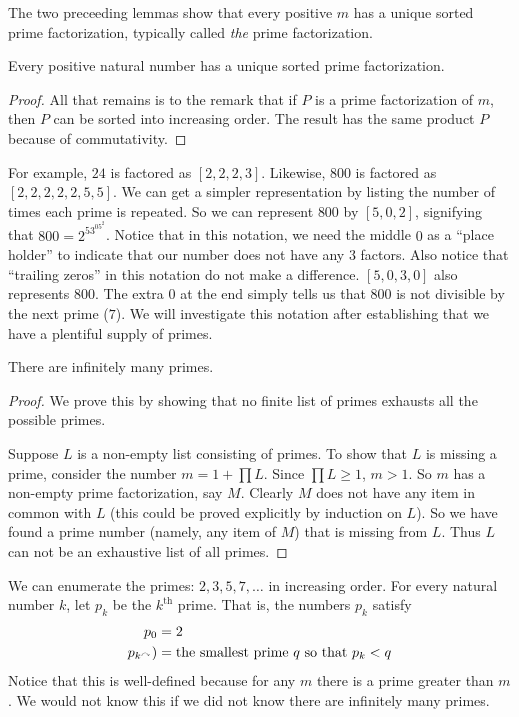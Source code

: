 The two preceeding lemmas show that every positive $m$ has a unique sorted 
prime factorization, typically called \emph{the} prime factorization.

\begin{thm}
  Every positive natural number has a unique sorted prime factorization.

  \begin{proof}
   All that remains is to the remark that if $P$ is a prime factorization of $m$,
   then $P$ can be sorted into increasing order. The result has the same product
   $P$ because of commutativity.  
  \end{proof}
\end{thm}

For example, $24$ is factored as $[2,2,2,3]$. Likewise, $800$ is factored as $[2,2,2,2,2,5,5]$.
We can get a simpler representation by listing the number of times each prime is repeated.
So we can represent $800$ by $[5,0,2]$, signifying that $800 = 2^53^05^2$. Notice that in
this notation, we need the middle $0$ as a ``place holder'' to indicate that our number does
not have any $3$ factors. Also notice that ``trailing zeros'' in this notation do not make a difference.
$[5,0,3,0]$ also represents $800$. The extra $0$ at the end simply tells us that $800$ is not
divisible by the next prime ($7$). We will investigate this notation after establishing that
we have a plentiful supply of primes.

\begin{thm}
There are infinitely many primes.

\begin{proof}
We prove this by showing that no finite list of primes exhausts all
the possible primes.

Suppose $L$ is a non-empty list consisting of primes. 
To show that $L$ is missing a prime, consider the number $m=1 + \prod L$.
Since $\prod L\geq 1$, $m > 1$. So $m$ has a non-empty prime factorization, say $M$.
Clearly $M$ does not have any item in common with $L$ (this could be proved explicitly
by induction on $L$).
So we have found a prime number (namely, any item of $M$) that is missing from $L$.
Thus $L$ can not be an exhaustive list of all primes.
\end{proof}
\end{thm}

\begin{defn}
We can enumerate the primes: $2,3,5,7,\ldots$ in increasing order. For every natural number $k$, let $p_k$ be the $k^{\text{th}}$ prime. That is, the numbers $p_k$ satisfy
\begin{align*}
  p_0 &= 2\\
  p_{k^\curvearrowright}) &= \text{the smallest prime $q$ so that $p_k<q$}
\end{align*}
Notice that this is well-defined because for any $m$ there is a prime greater than $m$.
We would not know this if we did not know there are infinitely many primes.
\end{defn}

